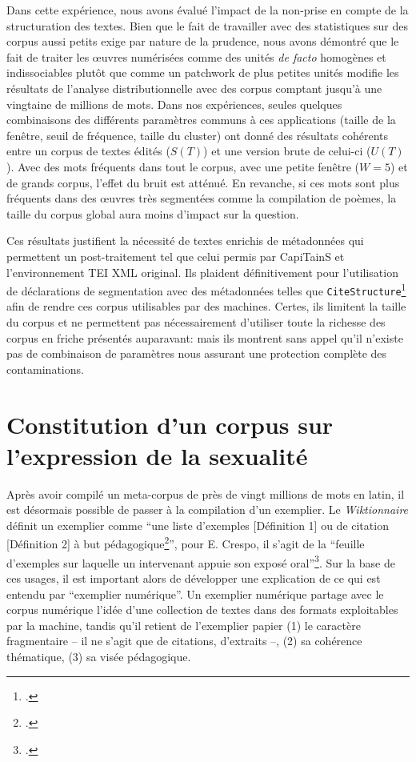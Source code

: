 Dans cette expérience, nous avons évalué l'impact de la non-prise en compte de la structuration des textes. Bien que le fait de travailler avec des statistiques sur des corpus aussi petits exige par nature de la prudence, nous avons démontré que le fait de traiter les œuvres numérisées comme des unités \textit{de facto} homogènes et indissociables plutôt que comme un patchwork de plus petites unités modifie les résultats de l'analyse distributionnelle avec des corpus comptant jusqu'à une vingtaine de millions de mots. Dans nos expériences, seules quelques combinaisons des différents paramètres communs à ces applications (taille de la fenêtre, seuil de fréquence, taille du cluster) ont donné des résultats cohérents entre un corpus de textes édités ($S(T)$) et une version brute de celui-ci ($U(T)$). Avec des mots fréquents dans tout le corpus, avec une petite fenêtre ($W=5$) et de grands corpus, l'effet du bruit est atténué. En revanche, si ces mots sont plus fréquents dans des œuvres très segmentées comme la compilation de poèmes, la taille du corpus global aura moins d'impact sur la question. 

Ces résultats justifient la nécessité de textes enrichis de métadonnées qui permettent un post-traitement tel que celui permis par CapiTainS et l'environnement TEI XML original. Ils plaident définitivement pour l'utilisation de déclarations de segmentation avec des métadonnées telles que \texttt{CiteStructure}\footcite{cayless_introducing_2021} afin de rendre ces corpus utilisables par des machines. Certes, ils limitent la taille du corpus et ne permettent pas nécessairement d'utiliser toute la richesse des corpus en friche présentés auparavant: mais ils montrent sans appel qu'il n'existe pas de combinaison de paramètres nous assurant une protection complète des contaminations.


\section{Constitution d’un corpus sur l’expression de la sexualité} 

Après avoir compilé un meta-corpus de près de vingt millions de mots en latin, il est désormais possible de passer à la compilation d'un exemplier. Le \textit{Wiktionnaire} définit un exemplier comme \enquote{une liste d’exemples [Définition 1] ou de citation [Définition 2] à but pédagogique\footcite{noauthor_exemplier_2019}}, pour E. Crespo, il s'agit de la \enquote{feuille
d’exemples sur laquelle un intervenant appuie son exposé oral}\footcite{crespo2011pour}. Sur la base de ces usages, il est important alors de développer une explication de ce qui est entendu par \enquote{exemplier numérique}. Un exemplier numérique partage avec le corpus numérique l'idée d'une collection de textes dans des formats exploitables par la machine, tandis qu'il retient de l'exemplier papier (1) le caractère fragmentaire -- il ne s'agit que de citations, d'extraits --, (2) sa cohérence thématique, (3) sa visée pédagogique. 

